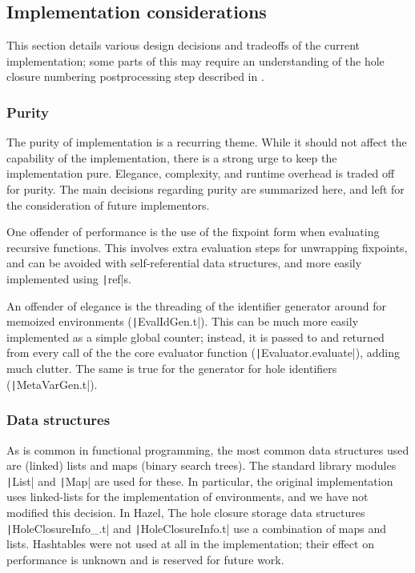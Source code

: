 \subsection{Implementation considerations}
\label{sec:evalenv_impl_considerations}

This section details various design decisions and tradeoffs of the current implementation; some parts of this may require an understanding of the hole closure numbering postprocessing step described in .

\subsubsection{Purity}
\label{sec:env-purity}
The purity of implementation is a recurring theme. While it should not affect the capability of the implementation, there is a strong urge to keep the implementation pure. Elegance, complexity, and runtime overhead is traded off for purity. The main decisions regarding purity are summarized here, and left for the consideration of future implementors.

One offender of performance is the use of the fixpoint form when evaluating recursive functions. This involves extra evaluation steps for unwrapping fixpoints, and can be avoided with self-referential data structures, and more easily implemented using \texttt|ref|s.

An offender of elegance is the threading of the identifier generator around for memoized environments (\texttt|EvalIdGen.t|). This can be much more easily implemented as a simple global counter; instead, it is passed to and returned from every call of the the core evaluator function (\texttt|Evaluator.evaluate|), adding much clutter. The same is true for the generator for hole identifiers (\texttt|MetaVarGen.t|).

\subsubsection{Data structures}
\label{sec:data-structures}

As is common in functional programming, the most common data structures used are (linked) lists and maps (binary search trees). The standard library modules \texttt|List| and \texttt|Map| are used for these. In particular, the original implementation uses linked-lists for the implementation of environments, and we have not modified this decision. In Hazel, The hole closure storage data structures \texttt|HoleClosureInfo_.t| and \texttt|HoleClosureInfo.t| use a combination of maps and lists. Hashtables were not used at all in the implementation; their effect on performance is unknown and is reserved for future work.

